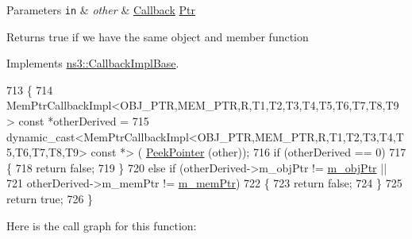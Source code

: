 \begin{DoxyParams}[1]{Parameters}
\mbox{\tt in}  & {\em other} & \hyperlink{classns3_1_1Callback}{Callback} \hyperlink{classns3_1_1Ptr}{Ptr} \\
\hline
\end{DoxyParams}
\begin{DoxyReturn}{Returns}
{\ttfamily true} if we have the same object and member function 
\end{DoxyReturn}


Implements \hyperlink{classns3_1_1CallbackImplBase_a199cb5c6bdf18e897bfcd59dfecde061}{ns3\+::\+Callback\+Impl\+Base}.


\begin{DoxyCode}
713                                                                  \{
714     MemPtrCallbackImpl<OBJ\_PTR,MEM\_PTR,R,T1,T2,T3,T4,T5,T6,T7,T8,T9> \textcolor{keyword}{const} *otherDerived = 
715       \textcolor{keyword}{dynamic\_cast<}MemPtrCallbackImpl<OBJ\_PTR,MEM\_PTR,R,T1,T2,T3,T4,T5,T6,T7,T8,T9> \textcolor{keyword}{const }*\textcolor{keyword}{>} (
      \hyperlink{namespacens3_af2a7557fe9afdd98d8f6f8f6e412cf5a}{PeekPointer} (other));
716     \textcolor{keywordflow}{if} (otherDerived == 0)
717       \{
718         \textcolor{keywordflow}{return} \textcolor{keyword}{false};
719       \}
720     \textcolor{keywordflow}{else} \textcolor{keywordflow}{if} (otherDerived->m\_objPtr != \hyperlink{classns3_1_1MemPtrCallbackImpl_a9df02a22837d1625d53331ae0924f89c}{m\_objPtr} ||
721              otherDerived->m\_memPtr != \hyperlink{classns3_1_1MemPtrCallbackImpl_a5f7142cdfa4bb1a88393a57d7f544c54}{m\_memPtr})
722       \{
723         \textcolor{keywordflow}{return} \textcolor{keyword}{false};
724       \}
725     \textcolor{keywordflow}{return} \textcolor{keyword}{true};
726   \}
\end{DoxyCode}


Here is the call graph for this function\+:


